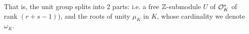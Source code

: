 \documentclass[11pt]{report}
\begin{document}
That is, the unit group splits into 2 parts: i.e. a free $\mathbb{Z}$-submodule $U$ of $\mathcal{O}_K^*$ of rank $(r + s - 1)$), and the roots of unity $\mu_K$ in $K$, whose cardinality we denote $\omega_K$.









\end{document}
